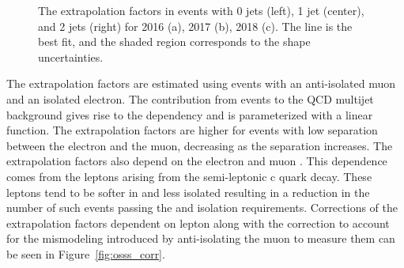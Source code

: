 \begin{figure}[htbp]
{  }
  \caption{The extrapolation factors in events with 0 jets (left), 1 jet (center), and 2 jets (right) for 2016 (a), 2017 (b), 2018 (c). The line is the best fit, and the shaded region corresponds to the shape uncertainties.}
  \label{fig:osss}
\end{figure}

The extrapolation factors are estimated using events with an anti-isolated muon and an isolated electron. The contribution from \bbarb events to the QCD multijet background gives rise to the \dr dependency and is parameterized with a linear function. The extrapolation factors are higher for events with low \dr separation between the electron and the muon, decreasing as the \dr separation increases. The extrapolation factors also depend on the electron and muon \pt. This \pt dependence comes from the leptons arising from the semi-leptonic c quark decay. These leptons tend to be softer in \pt and less isolated resulting in a reduction in the number of such events passing the \pt and isolation requirements. Corrections of the extrapolation factors dependent on lepton \pt along with the correction to account for the mismodeling introduced by anti-isolating the muon to measure them can be seen in Figure~\ref{fig:osss_corr}.

